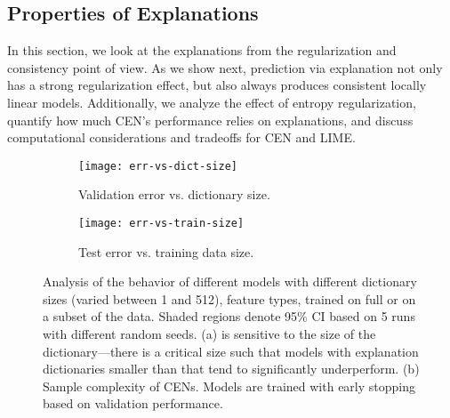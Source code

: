 \documentclass[twoside,11pt]{article}
\begin{document}
\subsection{Properties of Explanations}
\label{sec:applications-properties}

In this section, we look at the explanations from the regularization and consistency point of view.
As we show next, prediction via explanation not only has a strong regularization effect, but also always produces consistent locally linear models.
Additionally, we analyze the effect of entropy regularization, quantify how much CEN's performance relies on explanations, and discuss computational considerations and tradeoffs for CEN and LIME.


\begin{figure}[t]
    \centering
    \begin{subfigure}[b]{0.48\textwidth}
        \centering
        \texttt{[image: err-vs-dict-size]}
        \vspace{-16pt}\caption{Validation error vs. dictionary size.}
        \label{fig:dict-size}
    \end{subfigure}
    \begin{subfigure}[b]{0.48\textwidth}
        \centering
        \texttt{[image: err-vs-train-size]}
        \caption{Test error vs. training data size.}
        \label{fig:sample-complexity}
    \end{subfigure}
    \caption{Analysis of the behavior of different {\CEN} models with different dictionary sizes (varied between 1 and 512), feature types, trained on full or on a subset of the data.
    Shaded regions denote 95\% CI based on 5 runs with different random seeds.
    (a) {\CEN} is sensitive to the size of the dictionary---there is a critical size such that models with explanation dictionaries smaller than that tend to significantly underperform.
    (b) Sample complexity of CENs.
    Models are trained with early stopping based on validation performance.}
\end{figure}
 
\end{document}
